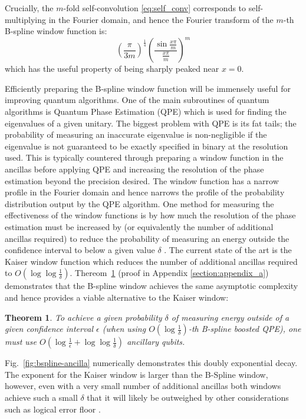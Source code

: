 \documentclass[aps,prx,twocolumn,floatfix,10pt,amssymb,amsfont,amsmath,superscriptaddress,float,nofootinbib,longbibliography,nobalancelastpage]{revtex4-2}
\newtheorem{theorem}{Theorem}
\theoremstyle{empty}
\begin{document}
  Crucially, the $m$-fold self-convolution \eqref{eq:self_conv} corresponds to self-multiplying in the Fourier domain, and hence the Fourier transform of the $m$-th B-spline window function is:
\begin{equation}
     \left(\frac{\pi}{3m}\right)^{\frac{1}{4}}\left(\frac{\sin \frac{x\pi}{m}}{ \frac{x\pi}{m}}\right)^m
\end{equation}
which has the useful property of being sharply peaked near $x=0$.


Efficiently preparing the B-spline window function will be immensely useful for improving quantum algorithms. One of the main subroutines of quantum algorithms is Quantum Phase Estimation (QPE) which is used for finding the eigenvalues of a given unitary. The biggest problem with QPE is its fat tails; the probability of measuring an inaccurate eigenvalue is non-negligible if the eigenvalue is not guaranteed to be exactly specified in binary at the resolution used. This is typically countered through preparing a window function in the ancillas before applying QPE and increasing the resolution of the phase estimation beyond the precision desired. The window function has a narrow profile in the Fourier domain and hence narrows the profile of the probability distribution output by the QPE algorithm. One method for measuring the effectiveness of the window functions is by how much the resolution of the phase estimation must be increased by (or equivalently the number of additional ancillas required) to reduce the probability of measuring an energy outside the confidence interval to below a given value $\delta$ \cite{Greenaway:2024jzs}. The current state of the art is the Kaiser window function \cite{Berry:2022ccu} which reduces the number of additional ancillas required to $O(\log \log \frac{1}{\delta})$. Thereom~\ref{theroem:b_spline} (proof in Appendix \ref{section:appendix_a}) demonstrates that the B-spline window achieves the same asymptotic complexity and hence provides a viable alternative to the Kaiser window: 

\begin{theorem}
\label{theroem:b_spline}
To achieve a given probability $\delta$ of measuring energy outside of a given confidence interval $\epsilon$ (when using $O(\log \frac{1}{\delta})$-th B-spline boosted QPE), one must use $O(\log \frac{1}{\epsilon} + \log \log \frac{1}{\delta})$ ancillary qubits.
\end{theorem}

Fig.~\ref{fig:bspline-ancilla} numerically demonstrates this doubly exponential decay. The exponent for the Kaiser window is larger than the B-Spline window, however, even with a very small number of additional ancillas both windows achieve such a small $\delta$ that it will likely be outweighed by other considerations such as logical error floor \cite{Acharya:2024btg}.
\end{document}
